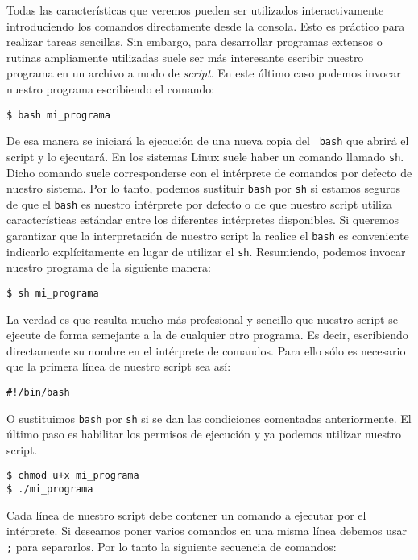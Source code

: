 Todas   las  características   que  veremos   pueden  ser   utilizados
interactivamente  introduciendo  los  comandos directamente  desde  la
consola. Esto es práctico para realizar tareas sencillas. Sin embargo,
para desarrollar  programas extensos o rutinas  ampliamente utilizadas
suele ser  más interesante escribir  nuestro programa en un  archivo a
modo  de {\em  script}. En  este último  caso podemos  invocar nuestro
programa escribiendo el comando:

\begin{verbatim}
$ bash mi_programa
\end{verbatim}

De esa  manera se iniciará  la ejecución de  una nueva copia  del {\tt
bash} que abrirá el script y lo ejecutará. En los sistemas Linux suele
haber  un  comando llamado  {\tt  sh}.  Dicho comando  suele
corresponderse con  el intérprete de  comandos por defecto  de nuestro
sistema. Por  lo tanto, podemos sustituir  {\tt bash} por {\tt  sh} si
estamos seguros de que el {\tt bash} es nuestro intérprete por defecto
o  de  que  nuestro  script  utiliza  características  estándar  entre
los  diferentes intérpretes  disponibles. Si  queremos garantizar  que
la  interpretación de  nuestro  script  la realice  el  {\tt bash}  es
conveniente indicarlo explícitamente en lugar de utilizar el {\tt sh}.
Resumiendo, podemos invocar nuestro programa de la siguiente manera:

\begin{verbatim}
$ sh mi_programa
\end{verbatim}

La verdad es que resulta mucho  más profesional y sencillo que nuestro
script se ejecute de forma semejante  a la de cualquier otro programa.
Es  decir, escribiendo  directamente  su nombre  en  el intérprete  de
comandos. Para ello sólo es necesario  que la primera línea de nuestro
script sea así:

\begin{verbatim}
#!/bin/bash
\end{verbatim}

O  sustituimos {\tt  bash}  por {\tt  sh} si  se  dan las  condiciones
comentadas anteriormente. El último paso  es habilitar los permisos de
ejecución y ya podemos utilizar nuestro script.

\begin{verbatim}
$ chmod u+x mi_programa
$ ./mi_programa
\end{verbatim}

Cada línea de  nuestro script debe contener un comando  a ejecutar por
el intérprete.  Si deseamos poner  varios comandos en una  misma línea
debemos  usar {\tt ;} para  separarlos. Por  lo tanto  la siguiente
secuencia de comandos:

